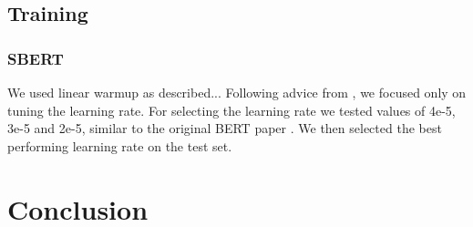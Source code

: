 \documentclass[10pt, a4paper]{article}
\begin{document}
\subsection{Training}

\subsubsection{SBERT}

We used linear warmup as described...
Following advice from \citet{gkouti2024should}, we focused only on tuning the learning rate. For selecting the learning rate we tested values of 4e-5, 3e-5 and 2e-5, similar to the original BERT paper \cite{devlin2018bert}. We then selected the best performing learning rate on the test set.




\section{Conclusion}



\end{document}
